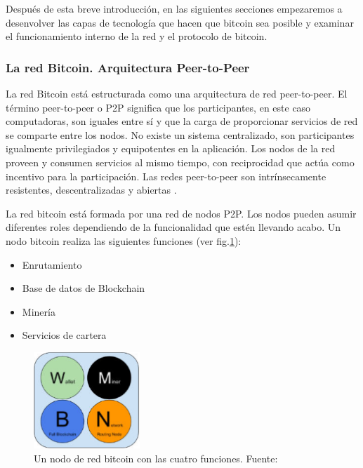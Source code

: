 \vspace{5mm}

\noindent Después de esta breve introducción, en las siguientes secciones empezaremos a desenvolver las capas de 
tecnología que hacen que bitcoin sea posible y examinar el funcionamiento interno de la red y el protocolo de bitcoin.

\subsubsection{La red Bitcoin. Arquitectura Peer-to-Peer}

La red Bitcoin está estructurada como una arquitectura de red peer-to-peer. El término peer-to-peer o P2P significa 
que los participantes, en este caso computadoras, son iguales entre sí y que la carga de proporcionar servicios de red 
se comparte entre los nodos. No existe un sistema centralizado, son participantes igualmente privilegiados y 
equipotentes en la aplicación. Los nodos de la red proveen y consumen servicios al mismo tiempo, con reciprocidad que 
actúa como incentivo para la participación. Las redes peer-to-peer son intrínsecamente resistentes, descentralizadas y 
abiertas \cite{antonopoulos2014mastering, peer-to-peer}. 
 
\vspace{5mm}

\noindent La red bitcoin está formada por una red de nodos P2P. Los nodos pueden asumir diferentes roles dependiendo de 
la funcionalidad que estén llevando acabo. Un nodo bitcoin realiza las siguientes funciones 
(ver fig.\ref{fig:funciones-nodo}): 

\begin{itemize}
    \item Enrutamiento
    \item Base de datos de Blockchain
    \item Minería
    \item Servicios de cartera
\end{itemize}

\begin{figure}[ht!]
    \centering
    \includegraphics[width=4cm]{imagenes/introduccion/nodo_bitcoin}
    \caption{Un nodo de red bitcoin con las cuatro funciones. Fuente: \cite{antonopoulos2014mastering}}
    \label{fig:funciones-nodo}
\end{figure}

